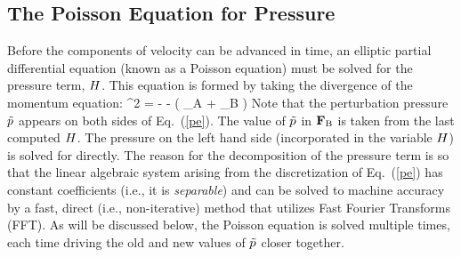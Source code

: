 \subsection{The Poisson Equation for Pressure}
\label{PoissonEq}

Before the components of velocity can be advanced in time, an elliptic partial differential equation (known as a Poisson equation) must be solved for the pressure term, $H$. This equation is formed by taking the divergence of the momentum equation:
\be
   \nabla^2 \cH = - - \nabla\!\cdot \left( \bF_{\rm A} + \bF_{\rm B} \right)  \label{pe}
\ee
Note that the perturbation pressure $\tilde{p}$ appears on both sides of Eq.~(\ref{pe}). The value of $\tilde{p}$ in ${\mathbf{F}}_{\rm B}$ is taken from the last computed $H$. The pressure on the left hand side (incorporated in the variable $H$) is solved for directly. The reason for the decomposition of the pressure term is so that the linear algebraic system arising from the discretization of Eq.~(\ref{pe}) has constant coefficients (i.e., it is {\em separable}) and can be solved to machine accuracy by a fast, direct (i.e., non-iterative) method that utilizes Fast Fourier Transforms (FFT). As will be discussed below, the Poisson equation is solved multiple times, each time driving the old and new values of $\tilde{p}$ closer together.


